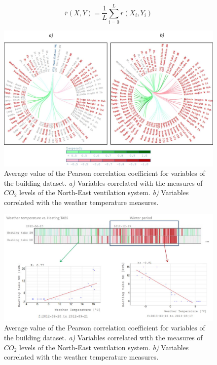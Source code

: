 \begin{equation}
\overline{r} (X,Y) = \frac{1}{L} \sum_{i=0}^L r(X_i,Y_i)
\label{aver}
\end{equation}


\begin{figure}[h!]
  \vspace{0.5em} %
  \includegraphics[scale=0.65]{Figures/flor_correlation.jpg}
  \caption{Average value of the Pearson correlation coefficient for variables of the building dataset. \textit{a)} Variables correlated with the measures of $CO_2$ levels of the North-East ventilation system. \textit{b)} Variables correlated with the weather temperature measures.}
  \label{fig:edge}
\end{figure}


\begin{figure}[h!]
  \vspace{0.5em} %
  \includegraphics[scale=0.65]{Figures/heatmap.jpg}
  \caption{Average value of the Pearson correlation coefficient for variables of the building dataset. \textit{a)} Variables correlated with the measures of $CO_2$ levels of the North-East ventilation system. \textit{b)} Variables correlated with the weather temperature measures.}
  \label{fig:heatmap}
\end{figure}

